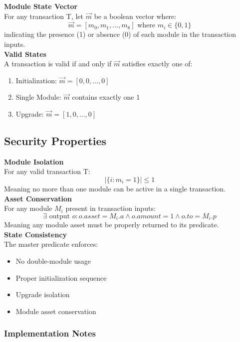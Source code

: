 \textbf{Module State Vector}\\
For any transaction T, let $\vec{m}$ be a boolean vector where:
\[ \vec{m} = [m_0, m_1, ..., m_8] \text{ where } m_i \in \{0,1\} \]
indicating the presence (1) or absence (0) of each module in the transaction inputs.\\

\textbf{Valid States}\\
A transaction is valid if and only if $\vec{m}$ satisfies exactly one of:
\begin{enumerate}
    \item Initialization: $\vec{m} = [0,0,...,0]$
    \item Single Module: $\vec{m}$ contains exactly one 1
    \item Upgrade: $\vec{m} = [1,0,...,0]$
\end{enumerate}



\subsection{Security Properties}

\textbf{Module Isolation}\\
For any valid transaction T:
\[ |\{i : m_i = 1\}| \leq 1 \]
Meaning no more than one module can be active in a single transaction.\\

\textbf{Asset Conservation}\\
For any module $M_i$ present in transaction inputs:
\[ \exists \text{ output } o : o.asset = M_i.a \land o.amount = 1 \land o.to = M_i.p \]
Meaning any module asset must be properly returned to its predicate.\\

\textbf{State Consistency}\\
The master predicate enforces:
\begin{itemize}
    \item No double-module usage
    \item Proper initialization sequence
    \item Upgrade isolation
    \item Module asset conservation
\end{itemize}


\subsubsection{Implementation Notes}

